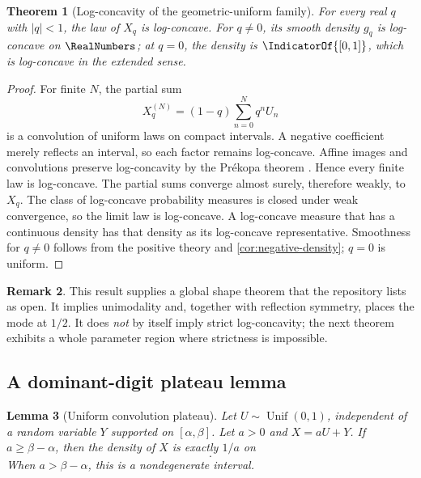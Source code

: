 \documentclass[11pt]{article}
\newtheorem{theorem}{Theorem}[section]
\newtheorem{lemma}[theorem]{Lemma}
\theoremstyle{definition}
\newtheorem{remark}[theorem]{Remark}
\begin{document}
\begin{theorem}[Log-concavity of the geometric-uniform family]\label{thm:logconcavity}
For every real \(q\) with \(\lvert q\rvert<1\), the law of \(X_q\) is log-concave.  For
\(q\ne0\), its smooth density \(g_q\) is log-concave on \(\RealNumbers\); at \(q=0\), the density
is \(\IndicatorOf{[0,1]}\), which is log-concave in the extended sense.
\end{theorem}

\begin{proof}
For finite \(N\), the partial sum
\[
 X_q^{(N)}=(1-q)\sum_{n=0}^{N}q^nU_n
\]
is a convolution of uniform laws on compact intervals.  A negative coefficient merely
reflects an interval, so each factor remains log-concave.  Affine images and convolutions
preserve log-concavity by the Pr\'ekopa theorem \cite{prekopa1973}.  Hence every finite
law is log-concave.  The partial sums converge almost surely, therefore weakly, to \(X_q\).
The class of log-concave probability measures is closed under weak convergence, so the
limit law is log-concave.  A log-concave measure that has a continuous density has that
density as its log-concave representative.  Smoothness for \(q\ne0\) follows from the
positive theory and \cref{cor:negative-density}; \(q=0\) is uniform.
\end{proof}

\begin{remark}
This result supplies a global shape theorem that the repository lists as open.  It implies
unimodality and, together with reflection symmetry, places the mode at \(1/2\).  It does
\emph{not} by itself imply strict log-concavity; the next theorem exhibits a whole
parameter region where strictness is impossible.
\end{remark}

\subsection{A dominant-digit plateau lemma}

\begin{lemma}[Uniform convolution plateau]\label{lem:uniform-plateau}
Let \(U\sim\operatorname{Unif}(0,1)\), independent of a random variable \(Y\) supported
on \([\alpha,\beta]\).  Let \(a>0\) and \(X=aU+Y\).  If \(a\ge\beta-\alpha\), then the
density of \(X\) is exactly \(1/a\) on
\begin{equation}
 [\beta,\alpha+a].                                        \label{eq:general-plateau}
\end{equation}
When \(a>\beta-\alpha\), this is a nondegenerate interval.
\end{lemma}
\end{document}
